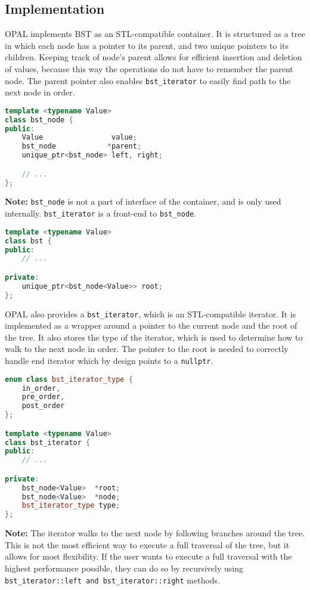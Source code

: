 \subsection{Implementation}

OPAL implements BST as an STL-compatible container. It is structured as a tree in which each node has a pointer to its parent, and two unique pointers to its children. Keeping track of node's parent allows for efficient insertion and deletion of values, because this way the operations do not have to remember the parent node. The parent pointer also enables \lstinline[columns=fixed]{bst_iterator} to easily find path to the next node in order.

\begin{lstlisting}[language=C++, caption=Node]
template <typename Value>
class bst_node {
public:
    Value                value;
    bst_node            *parent;
    unique_ptr<bst_node> left, right;

    // ...
};
\end{lstlisting}

\textbf{Note:} \lstinline[columns=fixed]{bst_node} is not a part of interface of the container, and is only used internally. \lstinline[columns=fixed]{bst_iterator} is a front-end to \lstinline[columns=fixed]{bst_node}.

\begin{lstlisting}[language=C++, caption=Tree Container]
template <typename Value>
class bst {
public:
    // ...

private:
    unique_ptr<bst_node<Value>> root;
};
\end{lstlisting}

OPAL also provides a \lstinline[columns=fixed]{bst_iterator}, which is an STL-compatible iterator. It is implemented as a wrapper around a pointer to the current node and the root of the tree. It also stores the type of the iterator, which is used to determine how to walk to the next node in order. The pointer to the root is needed to correctly handle end iterator which by design points to a \lstinline[columns=fixed]{nullptr}.

\begin{lstlisting}[language=C++, caption=Iterator]
enum class bst_iterator_type {
    in_order,
    pre_order,
    post_order
};

template <typename Value>
class bst_iterator {
public:
    // ...

private:
    bst_node<Value>  *root;
    bst_node<Value>  *node;
    bst_iterator_type type;
};
\end{lstlisting}

\textbf{Note:} The iterator walks to the next node by following branches around the tree. This is not the most efficient way to execute a full traversal of the tree, but it allows for most flexibility. If the user wants to execute a full traversal with the highest performance possible, they can do so by recursively using \lstinline[columns=fixed]{bst_iterator::left and bst_iterator::right} methods.
